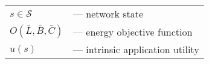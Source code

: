 \documentclass[]{article}
\begin{document}
\selectfont

\begin{tabular}{ll}
$s \in \mathcal{S}$ & --- network state\\
$O(\bar{L}, \bar{B}, \bar{C})$ & --- energy objective function\\
$u(s)$ & --- intrinsic application utility\\
\end{tabular}
\end{document}
